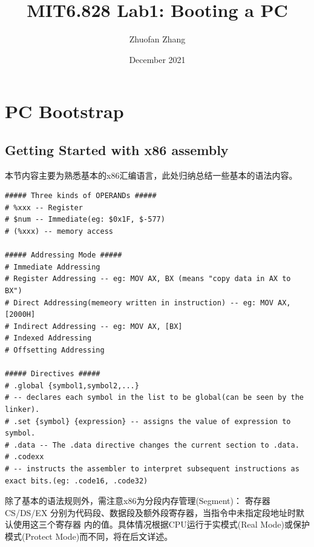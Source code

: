 \documentclass[12pt, letterpaper]{report}
\title{MIT6.828 Lab1: Booting a PC}
\author{Zhuofan Zhang}
\date{December 2021}
\begin{document}
\maketitle
\renewcommand\contentsname{\Huge Contents}
\tableofcontents{}


\newpage
{}
\chapter[\Large PC Bootstrap]{PC Bootstrap}
\section[\large Getting Started with x86 assembly]{Getting Started with x86 assembly}
本节内容主要为熟悉基本的x86汇编语言，此处归纳总结一些基本的语法内容。
\lstset{style=AssemblyStyle}
\setmainfont{Consolas}
\begin{lstlisting}
##### Three kinds of OPERANDs #####
# %xxx -- Register
# $num -- Immediate(eg: $0x1F, $-577)
# (%xxx) -- memory access

##### Addressing Mode #####
# Immediate Addressing
# Register Addressing -- eg: MOV AX, BX (means "copy data in AX to BX")
# Direct Addressing(memeory written in instruction) -- eg: MOV AX, [2000H]
# Indirect Addressing -- eg: MOV AX, [BX]
# Indexed Addressing
# Offsetting Addressing

##### Directives #####
# .global {symbol1,symbol2,...} 
# -- declares each symbol in the list to be global(can be seen by the linker).
# .set {symbol} {expression} -- assigns the value of expression to symbol.
# .data -- The .data directive changes the current section to .data.
# .codexx 
# -- instructs the assembler to interpret subsequent instructions as exact bits.(eg: .code16, .code32)
\end{lstlisting}
\setmainfont{Times New Roman}

除了基本的语法规则外，需注意x86为分段内存管理(Segment)：
寄存器 CS/DS/EX 分别为代码段、数据段及额外段寄存器，当指令中未指定段地址时默认使用这三个寄存器
内的值。具体情况根据CPU运行于实模式(Real Mode)或保护模式(Protect Mode)而不同，将在后文详述。 \par
\end{document}
